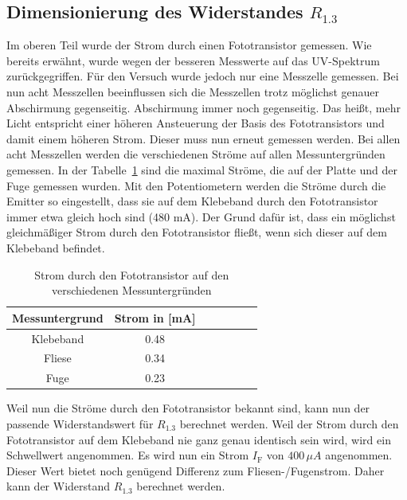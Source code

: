 \documentclass[main.tex]{subfiles} %
\begin{document}
\subsection*{Dimensionierung des Widerstandes $R_{1.3}$}
Im oberen Teil wurde der Strom durch einen Fototransistor gemessen. Wie bereits erwähnt, wurde wegen der besseren Messwerte auf das UV-Spektrum
zurückgegriffen. Für den Versuch wurde jedoch nur eine Messzelle gemessen. Bei nun acht Messzellen beeinflussen sich die Messzellen trotz möglichst genauer Abschirmung gegenseitig.
Abschirmung immer noch gegenseitig. Das heißt, mehr Licht entspricht einer höheren Ansteuerung der Basis des Fototransistors und damit einem höheren Strom.
Dieser muss nun erneut gemessen werden. Bei allen acht Messzellen werden die verschiedenen Ströme auf allen Messuntergründen gemessen. In der Tabelle~\ref{tab:Strommessungen_alle} sind die maximal
Ströme, die auf der Platte und der Fuge gemessen wurden. Mit den Potentiometern werden die Ströme durch die Emitter so eingestellt, dass sie auf dem Klebeband durch den Fototransistor immer
etwa gleich hoch sind (480 mA). Der Grund dafür ist, dass ein möglichst gleichmäßiger Strom durch den Fototransistor fließt, wenn sich dieser auf dem Klebeband befindet.
\begin{table}[h]
    \centering
    \begin{tabular}{|c|c|c|c|c|c|c|}
        \hline
        \textbf{Messuntergrund} & \textbf{Strom in [mA]} \\ \hline
        Klebeband               & 0.48                   \\ \hline
        Fliese                  & 0.34                   \\ \hline
        Fuge                    & 0.23                   \\ \hline

    \end{tabular}
    \caption{Strom durch den Fototransistor auf den verschiedenen Messuntergründen}
    \label{tab:Strommessungen_alle}
\end{table}

Weil nun die Ströme durch den Fototransistor bekannt sind, kann nun der
passende Widerstandswert für $R_{1.3}$ berechnet werden. Weil der Strom durch
den Fototransistor auf dem Klebeband nie ganz genau identisch sein wird, wird
ein Schwellwert angenommen. Es wird nun ein Strom $I_{\text{F}}$ von $400 \,
    \mu A$ angenommen. Dieser Wert bietet noch genügend Differenz zum
Fliesen-/Fugenstrom. Daher kann der Widerstand $R_{1.3}$ berechnet werden.
\end{document}
